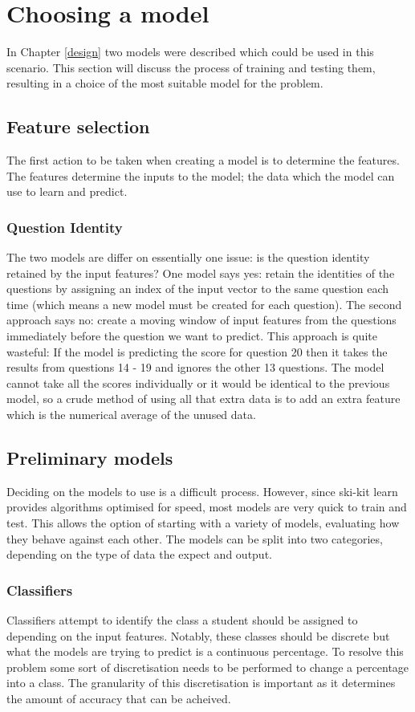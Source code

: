 \chapter{Choosing a model}
\label{machinelearning}
In Chapter \ref{design} two models were described which could be used in this scenario. This section will discuss the process of training and testing them, resulting in a choice of the most suitable model for the problem.

\section{Feature selection}
The first action to be taken when creating a model is to determine the features. The features determine the inputs to the model; the data which the model can use to learn and predict. 

\subsection{Question Identity}
The two models are differ on essentially one issue: is the question identity retained by the input features? One model says yes: retain the identities of the questions by assigning an index of the input vector to the same question each time (which means a new model must be created for each question). The second approach says no: create a moving window of input features from the questions immediately before the question we want to predict. This approach is quite wasteful: If the model is predicting the score for question 20 then it takes the results from questions 14 - 19 and ignores the other 13 questions. The model cannot take all the scores individually or it would be identical to the previous model, so a crude method of using all that extra data is to add an extra feature which is the numerical average of the unused data.

\section{Preliminary models}
Deciding on the models to use is a difficult process. However, since ski-kit learn provides algorithms optimised for speed, most models are very quick to train and test. This allows the option of starting with a variety of models, evaluating how they behave against each other. The models can be split into two categories, depending on the type of data the expect and output.

\subsection{Classifiers}
Classifiers attempt to identify the class a student should be assigned to depending on the input features. Notably, these classes should be discrete but what the models are trying to predict is a continuous percentage. To resolve this problem some sort of discretisation needs to be performed to change a percentage into a class. The granularity of this discretisation is important as it determines the amount of accuracy that can be acheived. 

